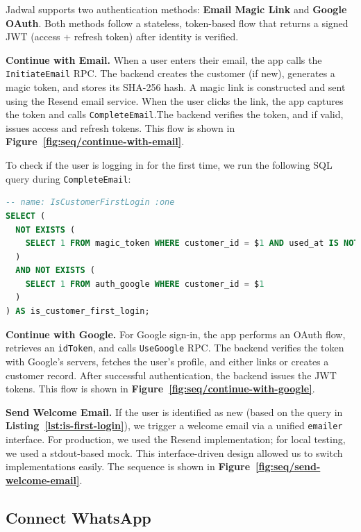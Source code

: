 Jadwal supports two authentication methods: \textbf{Email Magic Link} and \textbf{Google OAuth}. Both methods follow a stateless, token-based flow that returns a signed JWT (access + refresh token) after identity is verified.

\textbf{Continue with Email.} When a user enters their email, the app calls the \texttt{InitiateEmail} RPC.
The backend creates the customer (if new), generates a magic token, and stores its SHA-256 hash.
A magic link is constructed and sent using the Resend email service. When the user clicks the link, the app captures the token and calls \texttt{CompleteEmail}.The backend verifies the token, and if valid, issues access and refresh tokens. This flow is shown in \textbf{Figure~\ref{fig:seq/continue-with-email}}.

To check if the user is logging in for the first time, we run the following SQL query during \texttt{CompleteEmail}:

\begin{lstlisting}[language=SQL, caption={Check for First Login}, label={lst:is-first-login}]
-- name: IsCustomerFirstLogin :one
SELECT (
  NOT EXISTS (
    SELECT 1 FROM magic_token WHERE customer_id = $1 AND used_at IS NOT NULL
  )
  AND NOT EXISTS (
    SELECT 1 FROM auth_google WHERE customer_id = $1
  )
) AS is_customer_first_login;
\end{lstlisting}

\textbf{Continue with Google.} For Google sign-in, the app performs an OAuth flow, retrieves an \texttt{idToken}, and calls \texttt{UseGoogle} RPC. The backend verifies the token with Google's servers, fetches the user's profile, and either links or creates a customer record. After successful authentication, the backend issues the JWT tokens. This flow is shown in \textbf{Figure~\ref{fig:seq/continue-with-google}}.

\textbf{Send Welcome Email.} If the user is identified as new (based on the query in \textbf{Listing~\ref{lst:is-first-login}}), we trigger a welcome email via a unified \texttt{emailer} interface. For production, we used the Resend implementation; for local testing, we used a stdout-based mock. This interface-driven design allowed us to switch implementations easily. The sequence is shown in \textbf{Figure~\ref{fig:seq/send-welcome-email}}.

\subsection{Connect WhatsApp}

